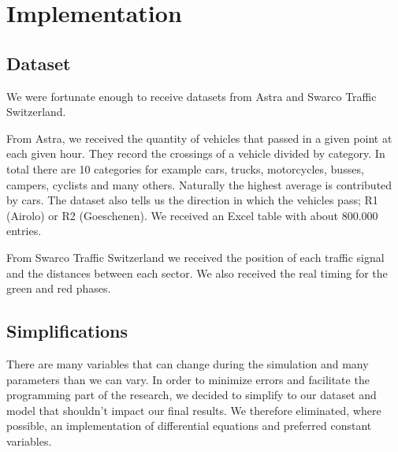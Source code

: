 \documentclass[11pt,a4paper,parskip=half-]{article}
\begin{document}

\section{Implementation}


\subsection{Dataset}

We were fortunate enough to receive datasets from Astra and Swarco Traffic Switzerland. 

From Astra, we received the quantity of vehicles that passed in a given point at each given hour. They record the crossings of a vehicle divided by category. In total there are 10 categories for example cars, trucks, motorcycles, busses, campers, cyclists and many others. Naturally the highest average is contributed by cars. The dataset also tells us the direction in which the vehicles pass; R1 (Airolo) or R2 (Goeschenen). We received an Excel table with about 800.000 entries. 

From Swarco Traffic Switzerland we received the position of each traffic signal and the distances between each sector. We also received the real timing for the green and red phases.  

\subsection{Simplifications}
There are many variables that can change during the simulation and many parameters than we can vary. In order to minimize errors and facilitate the programming part of the research, we decided to simplify to our dataset and model that shouldn't impact our final results. We therefore eliminated, where possible, an implementation of differential equations and preferred constant variables. 
\end{document}
